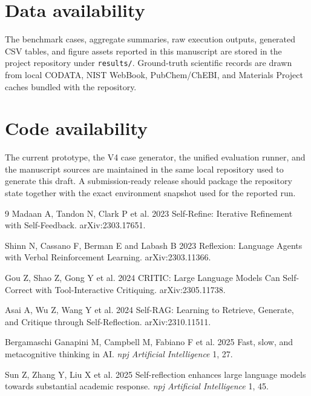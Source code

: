 \documentclass[12pt]{article}
\begin{document}
\section*{Data availability}

The benchmark cases, aggregate summaries, raw execution outputs, generated CSV tables, and figure assets reported in this manuscript are stored in the project repository under \texttt{results/}. Ground-truth scientific records are drawn from local CODATA, NIST WebBook, PubChem/ChEBI, and Materials Project caches bundled with the repository.

\section*{Code availability}

The current prototype, the V4 case generator, the unified evaluation runner, and the manuscript sources are maintained in the same local repository used to generate this draft. A submission-ready release should package the repository state together with the exact environment snapshot used for the reported run.

\begin{thebibliography}{9}
Madaan A, Tandon N, Clark P et al. 2023 Self-Refine: Iterative Refinement with Self-Feedback. arXiv:2303.17651.

Shinn N, Cassano F, Berman E and Labash B 2023 Reflexion: Language Agents with Verbal Reinforcement Learning. arXiv:2303.11366.

Gou Z, Shao Z, Gong Y et al. 2024 CRITIC: Large Language Models Can Self-Correct with Tool-Interactive Critiquing. arXiv:2305.11738.

Asai A, Wu Z, Wang Y et al. 2024 Self-RAG: Learning to Retrieve, Generate, and Critique through Self-Reflection. arXiv:2310.11511.

Bergamaschi Ganapini M, Campbell M, Fabiano F et al. 2025 Fast, slow, and metacognitive thinking in AI. \textit{npj Artificial Intelligence} 1, 27.

Sun Z, Zhang Y, Liu X et al. 2025 Self-reflection enhances large language models towards substantial academic response. \textit{npj Artificial Intelligence} 1, 45.
\end{thebibliography}
\end{document}
